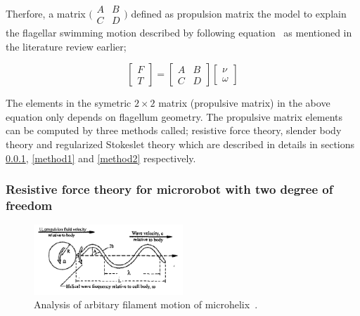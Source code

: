 \documentclass[12pt,a4paper,titlepage]{report}
\begin{document}
 Therfore, a matrix 
$\bigl(\begin{smallmatrix}
A&B\\ C&D
\end{smallmatrix} \bigr)$
 defined as propulsion matrix the
model to explain the flagellar swimming motion described by following equation~\citep{rodenborn2013propulsion}
as mentioned in the literature review earlier;
 

\[
\begin{bmatrix} F\\ 
T\end{bmatrix}  = \begin{bmatrix} A & B \\ 
C & D \end{bmatrix}  \begin{bmatrix} \nu
 \\ \omega
\end{bmatrix}
\]

The elements in the symetric $2\times2$ matrix (propulsive matrix) in the above equation only depends on 
flagellum geometry. The propulsive matrix elements can be computed by three methods called;
resistive force theory, slender body theory and regularized Stokeslet theory which are described in details in sections \ref{method3}, 
\ref{method1} and \ref{method2} respectively. 


\subsubsection{Resistive force theory for microrobot with two degree of freedom}\label{method3}



\begin{figure}
  \begin{center}
    \includegraphics[width=0.5\textwidth]{motion}
  \caption[Microrobot filament motion]{Analysis of arbitary filament motion of microhelix~\citep{edd2003biomimetic}.}
  \label{motion}
\end{center}
\end{figure}
\end{document}
